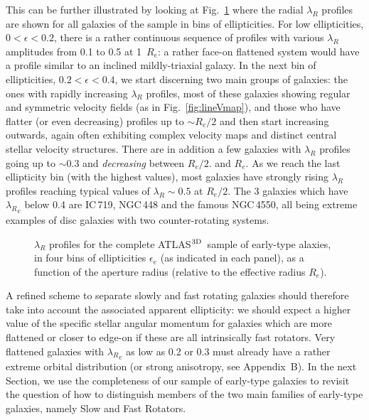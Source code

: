 \documentclass[useAMS,usenatbib,usegraphicx]{mn2e}
\newcommand{\atlas}{{ATLAS$^{\rm 3D}$}}
\begin{document}
This can be further illustrated by looking at Fig.~\ref{fig:LRprof} where
the radial $\lambda_R$ profiles are shown for all galaxies of the sample
in bins of ellipticities. For low ellipticities, $0 < \epsilon < 0.2$, there is
a rather continuous sequence of profiles with various $\lambda_R$ amplitudes from 0.1 to 0.5 at
1~$R_e$: a rather face-on flattened system would have a profile similar to an inclined mildly-triaxial galaxy.
In the next bin of ellipticities, $0.2 < \epsilon < 0.4$, we start discerning two main groups
of galaxies: the ones with rapidly increasing $\lambda_R$ profiles, most of
these galaxies showing regular and symmetric velocity fields (as in Fig.~\ref{fig:lineVmap}), and those
who have flatter (or even decreasing) profiles up to $\sim R_e/2$ and then start increasing outwards,
again often exhibiting complex velocity maps and distinct central stellar velocity structures.
There are in addition a few galaxies with $\lambda_R$ profiles going up to
$\sim 0.3$ and {\em decreasing} between $R_e / 2.$ and $R_e$.
As we reach the last ellipticity bin (with the highest values), most galaxies have
strongly rising $\lambda_R$ profiles reaching typical values of $\lambda_R \sim 0.5$ 
at $R_e / 2$. The 3 galaxies which have ${\lambda_R}_e$ below 0.4 are 
IC\,719, NGC\,448 and the famous NGC\,4550, all being extreme
examples of disc galaxies with two counter-rotating systems.
\begin{figure}
\centering
{}
\caption{$\lambda_R$ profiles for the complete \atlas\ sample of early-type
alaxies, in four bins of ellipticities  $\epsilon_e$ (as indicated in each panel), as a
function of the aperture radius (relative to the effective radius $R_e$).}
\label{fig:LRprof}
\end{figure}

A refined scheme to separate slowly and fast rotating galaxies should therefore
take into account the associated apparent ellipticity: we should expect
a higher value of the specific stellar angular momentum for galaxies which are
more flattened or closer to edge-on if these are all intrinsically fast
rotators. Very flattened galaxies with ${\lambda_R}_e$ as low as 0.2 or 0.3 must
already have a rather extreme orbital distribution (or strong anisotropy, see Appendix~B).
In the next Section, we use the completeness of our sample of early-type
galaxies to revisit the question of how to distinguish members of the two main
families of early-type galaxies, namely Slow and Fast Rotators.
\end{document}
